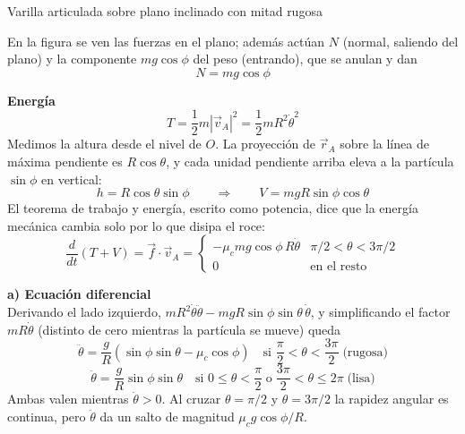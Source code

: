 \begin{solucion}{Varilla articulada sobre plano inclinado con mitad rugosa}
\begin{center}
\end{center}
En la figura se ven las fuerzas en el plano; además actúan $N$ (normal, saliendo del plano) y la componente $mg\cos\phi$ del peso (entrando), que se anulan y dan
$$N=mg\cos\phi$$

\textbf{Energía}
$$T=\frac{1}{2}m\left|\vec{v}_A\right|^2=\frac{1}{2}mR^2\dot\theta^2$$
Medimos la altura desde el nivel de $O$. La proyección de $\vec{r}_A$ sobre la línea de máxima pendiente es $R\cos\theta$, y cada unidad pendiente arriba eleva a la partícula $\sin\phi$ en vertical:
$$h=R\cos\theta\sin\phi\qquad\Longrightarrow\qquad V=mgR\sin\phi\cos\theta$$
El teorema de trabajo y energía, escrito como potencia, dice que la energía mecánica cambia solo por lo que disipa el roce:
$$\frac{d}{dt}\left(T+V\right)=\vec{f}\cdot\vec{v}_A=\begin{cases}-\mu_c mg\cos\phi\,R\dot\theta & \pi/2<\theta<3\pi/2\\[2pt] 0 & \text{en el resto}\end{cases}$$

\textbf{a) Ecuación diferencial}\\
Derivando el lado izquierdo, $mR^2\dot\theta\ddot\theta-mgR\sin\phi\sin\theta\,\dot\theta$, y simplificando el factor $mR\dot\theta$ (distinto de cero mientras la partícula se mueve) queda
$$\ddot\theta=\frac{g}{R}\left(\sin\phi\sin\theta-\mu_c\cos\phi\right)\quad\text{si }\frac{\pi}{2}<\theta<\frac{3\pi}{2}\;\text{(rugosa)}$$
$$\ddot\theta=\frac{g}{R}\sin\phi\sin\theta\quad\text{si }0\le\theta<\frac{\pi}{2}\;\text{o}\;\frac{3\pi}{2}<\theta\le2\pi\;\text{(lisa)}$$
Ambas valen mientras $\dot\theta>0$. Al cruzar $\theta=\pi/2$ y $\theta=3\pi/2$ la rapidez angular es continua, pero $\ddot\theta$ da un salto de magnitud $\mu_c g\cos\phi/R$.


\end{solucion}
